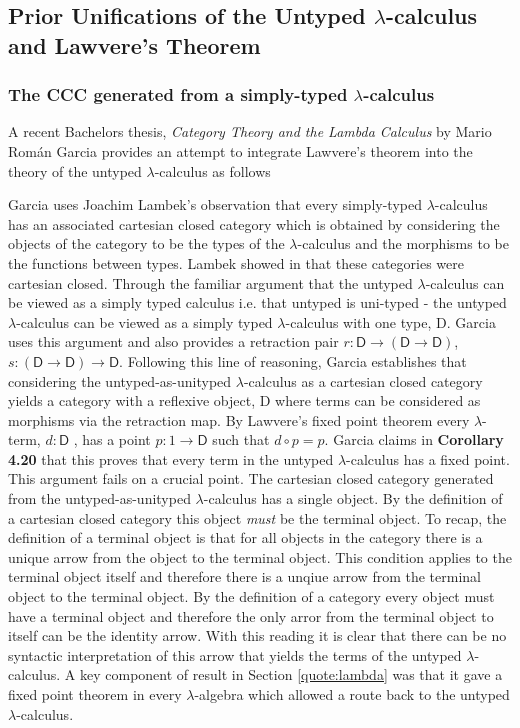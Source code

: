 \subsection{Prior Unifications of the Untyped $\lambda$-calculus and
Lawvere's Theorem}
\label{quote:prior}
\subsubsection{The CCC generated from a simply-typed $\lambda$-calculus}


A recent Bachelors thesis, \textit{Category Theory and the Lambda Calculus} by Mario
Rom\'an Garcia provides an attempt to integrate Lawvere's theorem into the
theory of the untyped $\lambda$-calculus as follows

Garcia uses Joachim Lambek's observation that every simply-typed
$\lambda$-calculus has an associated cartesian closed category which is obtained
by considering the objects of the category to be the types of the
$\lambda$-calculus and the morphisms to be the functions between types. Lambek
showed in \cite{lambek1985cartesian} that these categories were cartesian closed. Through the
familiar argument that the untyped $\lambda$-calculus can
be viewed as a simply typed calculus i.e.  that untyped is uni-typed - the
untyped $\lambda$-calculus can be viewed as a simply typed $\lambda$-calculus
with one type, \textsf{D}. Garcia uses this argument and also provides a
retraction pair $r : \textsf{D} \rightarrow (\textsf{D} \rightarrow
\textsf{D})$, $s : (\textsf{D} \rightarrow \textsf{D}) \rightarrow \textsf{D}$.
Following this line of reasoning, Garcia establishes that considering the
untyped-as-unityped $\lambda$-calculus as a cartesian closed category yields a
category with a reflexive object, \textsf{D} where terms can be considered as
morphisms via the retraction map. By Lawvere's fixed point theorem every
$\lambda$-term, $d : \textsf{D}$ , has a point $p: 1 \rightarrow \textsf{D}$
such that $d \circ p = p$. Garcia claims in \textbf{Corollary 4.20} that this
proves that every term in the untyped $\lambda$-calculus has a fixed point. This
argument fails on a crucial point. The cartesian closed category generated from
the untyped-as-unityped $\lambda$-calculus has a single object. By the
definition of a cartesian closed category this object \textit{must} be the
terminal object. To recap, the definition of a terminal object is that for all
objects in the category there is a unique arrow from the object to the terminal
object. This condition applies to the terminal object itself and therefore there
is a unqiue arrow from the terminal object to the terminal object. By the
definition of a category every object must have a terminal object and therefore
the only arror from the terminal object to itself can be the identity arrow.
With this reading it is clear that there can be no syntactic interpretation of
this arrow that yields the terms of the untyped $\lambda$-calculus. A key
component of result in Section \ref{quote:lambda}  was that it gave a fixed point
theorem in every $\lambda$-algebra which allowed a route back to the untyped
$\lambda$-calculus.

